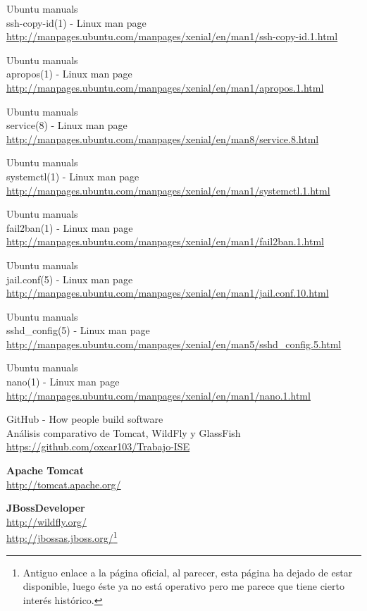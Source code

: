 \begin{thebibliography}{10}
Ubuntu manuals\\
ssh-copy-id(1) - Linux man page\\
  \url{http://manpages.ubuntu.com/manpages/xenial/en/man1/ssh-copy-id.1.html}

Ubuntu manuals\\
apropos(1) - Linux man page\\
  \url{http://manpages.ubuntu.com/manpages/xenial/en/man1/apropos.1.html}

Ubuntu manuals\\
service(8) - Linux man page\\
  \url{http://manpages.ubuntu.com/manpages/xenial/en/man8/service.8.html}

Ubuntu manuals\\
systemctl(1) - Linux man page\\
  \url{http://manpages.ubuntu.com/manpages/xenial/en/man1/systemctl.1.html}

Ubuntu manuals\\
fail2ban(1) - Linux man page\\
  \url{http://manpages.ubuntu.com/manpages/xenial/en/man1/fail2ban.1.html}

Ubuntu manuals\\
jail.conf(5) - Linux man page\\
  \url{http://manpages.ubuntu.com/manpages/xenial/en/man1/jail.conf.10.html}

Ubuntu manuals\\
sshd\_config(5) - Linux man page\\
  \url{http://manpages.ubuntu.com/manpages/xenial/en/man5/sshd_config.5.html}

Ubuntu manuals\\
nano(1) - Linux man page\\
  \url{http://manpages.ubuntu.com/manpages/xenial/en/man1/nano.1.html}

GitHub - How people build software\\
Análisis comparativo de Tomcat, WildFly y GlassFish\\
  \url{https://github.com/oxcar103/Trabajo-ISE}

\textbf{Apache Tomcat}\\
  \url{http://tomcat.apache.org/}

\textbf{JBossDeveloper}\\
  \url{http://wildfly.org/}\\
  \url{http://jbossas.jboss.org/}\footnote{Antiguo enlace a la página oficial, al parecer, esta página
  ha dejado de estar disponible, luego éste ya no está operativo pero me parece que tiene cierto
  interés histórico.}\\


\end{thebibliography}
